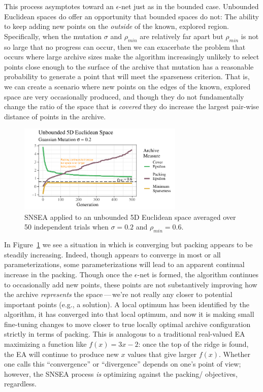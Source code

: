 \documentclass[twoside]{article}
\begin{document}
This process asymptotes toward an $\epsilon$-net just as in the bounded case.  Unbounded Euclidean spaces do offer an opportunity that bounded spaces do not:  The ability to keep adding new points on the \emph{outside} of the known, explored region.  Specifically, when the mutation $\sigma$ and $\rho_{min}$ are relatively far apart but $\rho_{min}$ is not so large that no progress can occur, then we can exacerbate the problem that occurs where large archive sizes make the algorithm increasingly unlikely to select points close enough to the surface of the archive that mutation has a reasonable probability to generate a point that will meet the sparseness criterion.  That is, we can create a scenario where new points on the edges of the known, explored space are very occasionally produced, and though they do not fundamentally change the ratio of the space that is \emph{covered} they do increase the largest pair-wise distance of points in the archive.
%
\begin{figure}[h]
  \center\includegraphics[width=0.7\textwidth]{Figures/unbounded-s02-r06-NOPOP.pdf}
  \caption{\label{fig:unbounded:nopop:0206} SNSEA applied to an unbounded 5D Euclidean space averaged over 50 independent trials when $\sigma=0.2$ and $\rho_{min}=0.6$.}
\end{figure}

In Figure~\ref{fig:unbounded:nopop:0206} we see a situation in which  is converging but packing appears to be steadily increasing.  Indeed, though  appears to converge in most or all parameterizations, some parameterizations will lead to an apparent continual increase in the packing.  Though once the $\epsilon$-net is formed, the algorithm continues to occasionally add new points, these points are not substantively improving how the archive \emph{represents} the space\,---\,we're not really any closer to potential important points (e.g., a solution).  A local optimum has been identified by the algorithm, it has converged into that local optimum, and now it is making small fine-tuning changes to move closer to true locally optimal archive configuration strictly in terms of packing. This is analogous to a traditional real-valued EA maximizing a function like $f(x)=3x - 2$: once the top of the ridge is found, the EA will continue to produce new $x$ values that give larger $f(x)$.  Whether one calls this ``convergence'' or ``divergence'' depends on one's point of view; however, the SNSEA process \emph{is} optimizing against the packing/ objectives, regardless.
\end{document}
